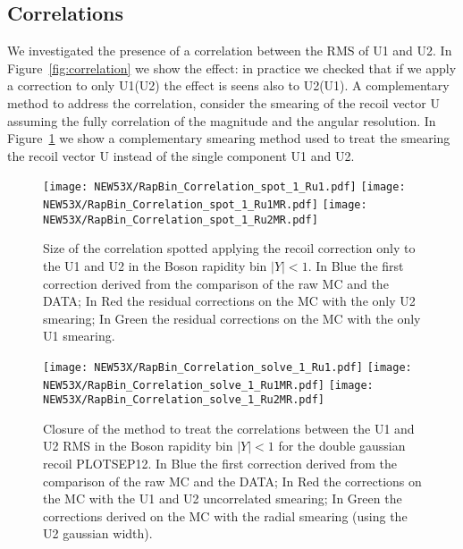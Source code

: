 \documentclass[41pt,a4paper,oneside]{report}
\begin{document}
\subsection{Correlations}
\label{sec:Correlation}

We investigated the presence of a correlation between the RMS of U1 and U2.
In Figure~\ref{fig:correlation} we show the effect: in practice we checked that if we apply a correction to only U1(U2) the effect is seens also to U2(U1). 
A complementary method to address the correlation, consider the smearing of the recoil vector U assuming the fully correlation of the magnitude and the angular resolution.
In Figure~\ref{fig:correlationSolve} we show a complementary smearing method used to treat the smearing the recoil vector U instead of the single component U1 and U2.

\begin{figure}[h!]
  \begin{center}
    \texttt{[image: NEW53X/RapBin\_Correlation\_spot\_1\_Ru1.pdf]}
    \texttt{[image: NEW53X/RapBin\_Correlation\_spot\_1\_Ru1MR.pdf]}
    \texttt{[image: NEW53X/RapBin\_Correlation\_spot\_1\_Ru2MR.pdf]}
    \caption{Size of the correlation spotted applying the recoil correction only to the U1 and U2 in the Boson rapidity bin $|Y|<1$.
      In Blue the first correction derived from the comparison of the raw MC and the DATA; 
      In Red the residual corrections on the MC with the only U2 smearing;
      In Green the residual corrections on the MC with the only U1 smearing.}
    \label{fig:correlation}
  \end{center}
  \begin{center}
    \texttt{[image: NEW53X/RapBin\_Correlation\_solve\_1\_Ru1.pdf]}
    \texttt{[image: NEW53X/RapBin\_Correlation\_solve\_1\_Ru1MR.pdf]}
    \texttt{[image: NEW53X/RapBin\_Correlation\_solve\_1\_Ru2MR.pdf]}
    \caption{Closure of the method to treat the correlations between the U1 and U2 RMS in the Boson rapidity bin $|Y|<1$ for the double gaussian recoil PLOTSEP12.
      In Blue the first correction derived from the comparison of the raw MC and the DATA; 
      In Red the corrections on the MC with the U1 and U2 uncorrelated smearing; 
      In Green the corrections derived on the MC with the radial smearing (using the U2 gaussian width).}
    \label{fig:correlationSolve}
  \end{center}
\end{figure}
\end{document}
